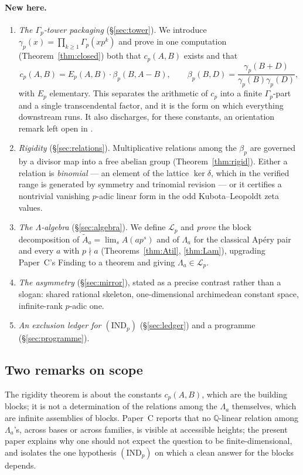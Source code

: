 \documentclass[11pt,reqno]{article}
\newcommand{\QQ}{\mathbb{Q}}
\newcommand{\Gp}{\Gamma_p}
\newcommand{\gtow}{\gamma_p}
\newcommand{\bet}{\beta_p}
\newcommand{\Atil}{\widetilde{A}}
\newcommand{\Lalg}{\mathcal{L}_p}
\theoremstyle{plain}
\theoremstyle{definition}
\theoremstyle{remark}
\numberwithin{equation}{section}
\begin{document}
\paragraph{New here.}
\begin{enumerate}[label=(\Alph*),leftmargin=2.1em]
\item \emph{The $\Gp$-tower packaging} (\S\ref{sec:tower}).  We introduce
  $\gtow(x)=\prod_{k\ge1}\Gp(xp^k)$ and prove in one computation
  (Theorem~\ref{thm:closed}) both that $c_p(A,B)$ exists and that
  \[
    c_p(A,B)=E_p(A,B)\cdot\bet(B,A-B),\qquad
    \bet(B,D)=\frac{\gtow(B+D)}{\gtow(B)\gtow(D)},
  \]
  with $E_p$ elementary.  This separates the arithmetic of $c_p$ into a finite
  $\Gp$-part and a single transcendental factor, and it is the form on which
  everything downstream runs.  It also discharges, for these constants, an
  orientation remark left open in \cite[\S2.4]{PaperB}.
\item \emph{Rigidity} (\S\ref{sec:relations}).  Multiplicative relations among
  the $\bet$ are governed by a divisor map into a free abelian group
  (Theorem~\ref{thm:rigid}).  Either a relation is \emph{binomial} --- an element
  of the lattice $\ker\delta$, which in the verified range is generated by
  symmetry and trinomial revision --- or it certifies a nontrivial vanishing
  $p$-adic linear form in the odd Kubota--Leopoldt zeta values.
\item \emph{The $\Lambda$-algebra} (\S\ref{sec:algebra}).  We define $\Lalg$ and
  \emph{prove} the block decomposition of $\Atil_a=\lim_sA(ap^s)$ and of
  $\Lambda_a$ for the classical Ap\'ery pair and every $a$ with $p\nmid a$
  (Theorems~\ref{thm:Atil}, \ref{thm:Lam}), upgrading Paper~C's Finding to a
  theorem and giving $\Lambda_a\in\Lalg$.
\item \emph{The asymmetry} (\S\ref{sec:mirror}), stated as a
  precise contrast rather than a slogan: shared rational skeleton,
  one-dimensional archimedean constant space, infinite-rank $p$-adic one.
\item \emph{An exclusion ledger for $(\mathrm{IND}_p)$}
  (\S\ref{sec:ledger}) and a programme (\S\ref{sec:programme}).
\end{enumerate}

\subsection{Two remarks on scope}

The rigidity theorem is about the constants $c_p(A,B)$, which are the building
blocks; it is not a determination of the relations among the $\Lambda_a$
themselves, which are infinite assemblies of blocks.  Paper~C reports that no
$\QQ$-linear relation among $\Lambda_a$'s, across bases or across families, is
visible at accessible heights; the present paper explains why one should not
expect the question to be finite-dimensional, and isolates the one hypothesis
$(\mathrm{IND}_p)$ on which a clean answer for the blocks depends.
\end{document}
